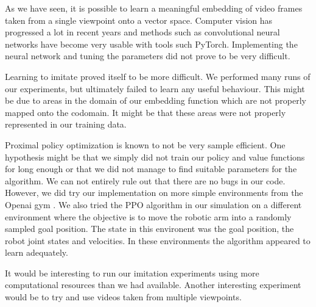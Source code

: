
As we have seen, it is possible to learn a meaningful embedding of video frames taken from a single viewpoint onto a vector space. Computer vision has progressed a lot in recent years and methods such as convolutional neural networks have become very usable with tools such PyTorch. Implementing the neural network and tuning the parameters did not prove to be very difficult.

Learning to imitate proved itself to be more difficult. We performed many runs of our experiments, but ultimately failed to learn any useful behaviour. This might be due to areas in the domain of our embedding function which are not properly mapped onto the codomain. It might be that these areas were not properly represented in our training data.

Proximal policy optimization is known to not be very sample efficient. One hypothesis might be that we simply did not train our policy and value functions for long enough or that we did not manage to find suitable parameters for the algorithm. We can not entirely rule out that there are no bugs in our code. However, we did try our implementation on more simple environments from the Openai gym \citep{gym}. We also tried the PPO algorithm in our simulation on a different environment where the objective is to move the robotic arm into a randomly sampled goal position. The state in this environent was the goal position, the robot joint states and velocities. In these environments the algorithm appeared to learn adequately.

It would be interesting to run our imitation experiments using more computational resources than we had available. Another interesting experiment would be to try and use videos taken from multiple viewpoints.


